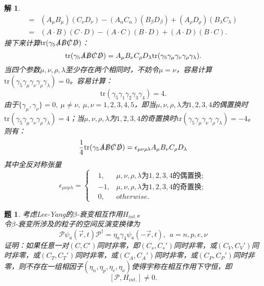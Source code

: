 \documentclass[UTF8,10pt,a4paper]{article}
\theoremstyle{Problem}%
\newtheorem{prob}{题}%
\theoremstyle{Solution}%
\newtheorem*{sol}{解}%
\begin{document}
\begin{sol}
\[\begin{aligned}
    =& (A_\mu B_\mu)(C_\nu D_\nu) - (A_\alpha C_\alpha) (B_\beta D_\beta) + (A_\rho D_\rho) (B_\lambda C_\lambda) \\
    =& (A \cdot B)(C \cdot D) - (A \cdot C)(B \cdot D) + (A \cdot D)(B \cdot C).
    \end{aligned}
\]
接下来计算$\text{tr}(\gamma_5 \slashed{A} \slashed{B} \slashed{C} \slashed{D})$：
\[
    \text{tr}(\gamma_5 \slashed{A} \slashed{B} \slashed{C} \slashed{D}) = A_\mu B_\nu C_\rho D_\lambda \text{tr}(\gamma_5 \gamma_\mu \gamma_\nu \gamma_\rho \gamma_\lambda).
\]
当四个参数$\mu,\nu,\rho,\lambda$至少存在两个相同时，不妨令$\mu = \nu$，容易计算$\text{tr}(\gamma_5 \gamma_\mu \gamma_\nu \gamma_\rho \gamma_\lambda) = 0$。容易计算：
\[
    \text{tr}(\gamma_5 \gamma_1 \gamma_2 \gamma_3 \gamma_4) = 4.
\]
由于$\{\gamma_\mu, \gamma_\nu\} = 0, ~ \mu\neq\nu, ~ \mu,\nu = 1,2,3,4,5$，即当$\mu,\nu,\rho,\lambda$为$1,2,3,4$的偶置换时$\text{tr}(\gamma_5 \gamma_\mu \gamma_\nu \gamma_\rho \gamma_\lambda) = 4$；当$\mu,\nu,\rho,\lambda$为$1,2,3,4$的奇置换时$\text{tr}(\gamma_5 \gamma_\mu \gamma_\nu \gamma_\rho \gamma_\lambda) = -4$。 \\
则有：
\[
    \frac{1}{4}\text{tr}(\gamma_5\slashed{A}\slashed{B}\slashed{C}\slashed{D}) = \epsilon_{\mu\nu\rho\lambda} A_{\mu}B_{\nu} C_{\rho} D_{\lambda}
\]
其中全反对称张量
\[
    \epsilon_{\mu\nu\rho\lambda} = \left\{ 
        \begin{aligned}
            &1, &\mu,\nu,\rho,\lambda \text{为}1,2,3,4\text{的偶置换}; \\
            &-1, &\mu,\nu,\rho,\lambda \text{为}1,2,3,4\text{的奇置换}; \\
            &0, &otherwise.
        \end{aligned}
    \right.
\]
\end{sol}


\begin{prob}
考虑Lee-Yang的$\beta$-衰变相互作用$H_{int.}$。 \\
令$\beta$-衰变所涉及的粒子的空间反演变换律为
\[
    \mathcal{P}\psi_a(\vec{r},t)\mathcal{P}^\dagger = \eta_a\gamma_4\psi_a(-\vec{r},t), ~~ a = n,p,e,\nu
\]
证明：如果任意一对$(C,C')$同时非零，即$(C_s,C_s')$同时非零，或$(C_V,C_V')$同时非零，或$(C_T,C_T')$同时非零，或$(C_A,C_A')$同时非零，或$(C_P,C_P')$同时非零，则不存在一组相因子$(\eta_n,\eta_p,\eta_e,\eta_\nu)$使得宇称在相互作用下守恒，即
\[
    [\mathcal{P}, H_{int.}] \neq 0.
\]
\end{prob}
\end{document}
